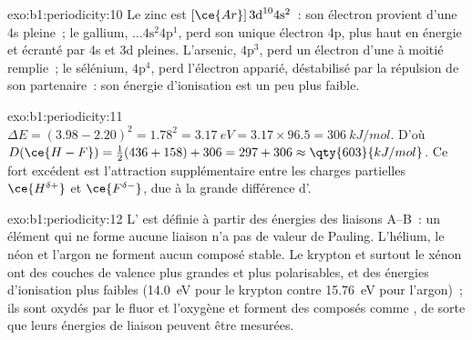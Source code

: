 \begin{solution}{exo:b1:periodicity:10}
Le zinc est $[\ce{Ar}]\,3\text{d}^{10} 4\text{s}^2$~: son électron
provient d'une  4s pleine~; le gallium,
$\dots 4\text{s}^2 4\text{p}^1$, perd son unique électron 4p, plus haut en énergie et
écranté par 4s et 3d pleines. L'arsenic, $4\text{p}^3$, perd un électron
d'une  à moitié remplie~; le sélénium, $4\text{p}^4$, perd
l'électron apparié, déstabilisé par la répulsion de son partenaire~: son
énergie d'ionisation est un peu plus faible.
\end{solution}

\begin{solution}{exo:b1:periodicity:11}
$\Delta E = (3.98 - 2.20)^2 = 1.78^2 = \qty{3.17}{eV} = 3.17 \times 96.5 =
\qty{306}{kJ/mol}$. D'où $D(\ce{H-F}) = \tfrac12(436 + 158) + 306 = 297 +
306 \approx \qty{603}{kJ/mol}$. Ce fort excédent est l'attraction
supplémentaire entre les charges partielles $\ce{H^{\delta+}}$ et
$\ce{F^{\delta-}}$, due à la grande différence d'.
\end{solution}

\begin{solution}{exo:b1:periodicity:12}
L' est définie à partir des énergies des liaisons
A--B~: un élément qui ne forme aucune liaison n'a pas de valeur de
Pauling. L'hélium, le néon et l'argon ne forment aucun composé stable.
Le krypton et surtout le xénon ont des couches de valence plus grandes et
plus polarisables, et des énergies d'ionisation plus faibles
(\qty{14.0}{eV} pour le krypton contre \qty{15.76}{eV} pour l'argon)~;
ils sont oxydés par le fluor et l'oxygène et forment des composés comme
, de sorte que leurs énergies de liaison peuvent être mesurées.
\end{solution}

